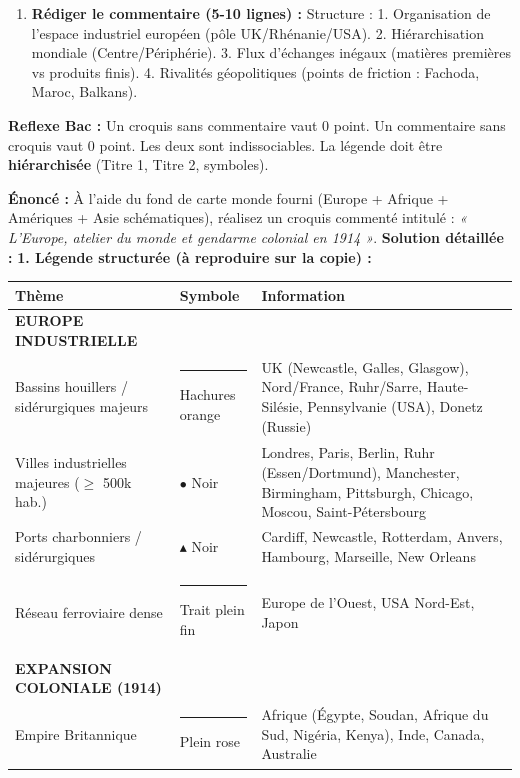 \documentclass[11pt]{article}
\begin{document}
\begin{methode}
\begin{enumerate}
    \item \textbf{Rédiger le commentaire (5-10 lignes) :} Structure : 1. Organisation de l'espace industriel européen (pôle UK/Rhénanie/USA). 2. Hiérarchisation mondiale (Centre/Périphérie). 3. Flux d'échanges inégaux (matières premières vs produits finis). 4. Rivalités géopolitiques (points de friction : Fachoda, Maroc, Balkans).
\end{enumerate}
\textbf{Reflexe Bac :} Un croquis sans commentaire vaut 0 point. Un commentaire sans croquis vaut 0 point. Les deux sont indissociables. La légende doit être \textbf{hiérarchisée} (Titre 1, Titre 2, symboles).
\end{methode}

\begin{exoresolu}
\textbf{Énoncé :} À l'aide du fond de carte monde fourni (Europe + Afrique + Amériques + Asie schématiques), réalisez un croquis commenté intitulé : \emph{« L'Europe, atelier du monde et gendarme colonial en 1914 »}.
\tcblower
\textbf{Solution détaillée :}
\textbf{1. Légende structurée (à reproduire sur la copie) :}
\begin{center}
\begin{tabular}{|l|l|l|}
\hline
\rowcolor{popblueL}
\textbf{Thème} & \textbf{Symbole} & \textbf{Information} \\
\hline
\textbf{EUROPE INDUSTRIELLE} & & \\
Bassins houillers / sidérurgiques majeurs & \textcolor{poporange}{\rule{1cm}{2pt}} Hachures orange & UK (Newcastle, Galles, Glasgow), Nord/France, Ruhr/Sarre, Haute-Silésie, Pennsylvanie (USA), Donetz (Russie) \\
Villes industrielles majeures ($\geq$ 500k hab.) & $\bullet$ Noir & Londres, Paris, Berlin, Ruhr (Essen/Dortmund), Manchester, Birmingham, Pittsburgh, Chicago, Moscou, Saint-Pétersbourg \\
Ports charbonniers / sidérurgiques & $\blacktriangle$ Noir & Cardiff, Newcastle, Rotterdam, Anvers, Hambourg, Marseille, New Orleans \\
Réseau ferroviaire dense & \textcolor{popdark}{\rule{1cm}{2pt}} Trait plein fin & Europe de l'Ouest, USA Nord-Est, Japon \\
\hline
\textbf{EXPANSION COLONIALE (1914)} & & \\
Empire Britannique & \textcolor{poppink}{\rule{1cm}{2pt}} Plein rose & Afrique (Égypte, Soudan, Afrique du Sud, Nigéria, Kenya), Inde, Canada, Australie \\

\end{tabular}
\end{center}
\end{exoresolu}
\end{document}
